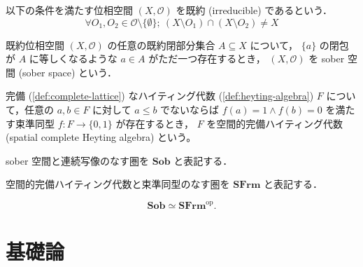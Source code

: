 \documentclass[titlepage]{ltjsreport}
\begin{document}
\begin{definition}[既約]
  以下の条件を満たす位相空間
  $(X,\mathcal{O})$
  を既約
  (irreducible)
  であるという．
  \begin{equation}
    \forall O_1,O_2\in\mathcal{O}\setminus\{\emptyset\};
    \ (X\setminus O_1)\cap(X\setminus O_2)\neq X
  \end{equation}
\end{definition}

\begin{definition}[sober 空間]
  既約位相空間
  $(X,\mathcal{O})$
  の任意の既約閉部分集合
  $A\subseteq X$
  について，
  $\{a\}$
  の閉包が
  $A$
  に等しくなるような
  $a\in A$
  がただ一つ存在するとき，
  $(X,\mathcal{O})$
  を sober 空間 (sober space) という．
\end{definition}

\begin{definition}[空間的完備ハイティング代数]
  完備
  (\cref{def:complete-lattice})
  なハイティング代数
  (\cref{def:heyting-algebra})
  $F$
  について，任意の
  $a,b\in F$
  に対して
  $a\le b$
  でないならば
  $f(a)=1\wedge f(b)=0$
  を満たす束準同型
  $f:F\to\{0,1\}$
  が存在するとき，
  $F$
  を空間的完備ハイティング代数
  (spatial complete Heyting algebra)
  という。
\end{definition}

\newcommand{\sob}{\mathbf{Sob}}
\newcommand{\sfrm}{\mathbf{SFrm}}

\begin{definition}
  sober 空間と連続写像のなす圏を $\sob$ と表記する．
\end{definition}

\begin{definition}[空間的完備ハイティング代数の圏]
  空間的完備ハイティング代数と束準同型のなす圏を $\sfrm$ と表記する．
\end{definition}

\begin{theorem}[ストーンの双対性定理]
  \begin{equation}
    \sob\simeq\sfrm^\mathrm{op}.
  \end{equation}
\end{theorem}

\appendix

\chapter{基礎論}
\end{document}
